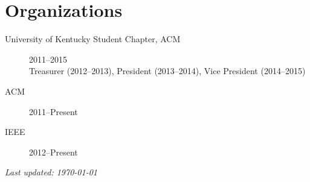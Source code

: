 \documentclass[12pt]{article}
\begin{document}
\nocite{*}
\printbibliography[heading=none]

\section*{Organizations}

\begin{description}
    \item[University of Kentucky Student Chapter, ACM] 
        2011--2015 \\
        Treasurer (2012--2013), President (2013--2014), Vice President
        (2014--2015)
    \item[ACM] 2011--Present
    \item[IEEE] 2012--Present
\end{description}

\vspace{\fill}
{\centering
    \small\emph{Last updated: \today}\par
}
\end{document}
